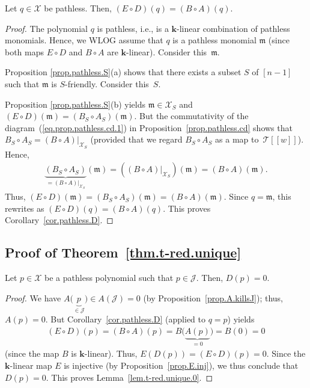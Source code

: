 \begin{Corollary}\label{cor.pathless.D}Let $q\in\mathcal{X}$ be pathless. Then, $( E\circ D ) (q) = ( B\circ A ) (q) $.
\end{Corollary}

\begin{proof}The polynomial $q$ is pathless, i.e., is a $\mathbf{k}$-linear combination of pathless monomials. Hence, we WLOG assume that $q$ is a pathless monomial $\mathfrak{m}$ (since both maps $E\circ D$ and $B\circ A$ are $\mathbf{k}$-linear). Consider this~$\mathfrak{m}$.

Proposition \ref{prop.pathless.S}(a) shows that there exists a subset $S$ of $[n-1] $ such that $\mathfrak{m}$ is $S$-friendly. Consider this~$S$.

Proposition \ref{prop.pathless.S}(b) yields $\mathfrak{m}\in\mathcal{X}_{S}$ and $(E\circ D) (\mathfrak{m}) = ( B_{S}\circ A_{S} ) (\mathfrak{m}) $. But the commutativity of the diagram~(\ref{eq.prop.pathless.cd.1}) in Proposition~\ref{prop.pathless.cd} shows that $B_{S}\circ A_{S}= ( B\circ A ) |_{\mathcal{X}_{S}}$ (provided that we regard $B_{S}\circ A_{S}$ as a map to~$\mathcal{T}[[w]] $). Hence,
\begin{gather*}
\underbrace{( B_{S}\circ A_{S}) }_{=( B\circ A)|_{\mathcal{X}_{S}}}(\mathfrak{m}) = (( B\circ A ) |_{\mathcal{X}_{S}} ) (\mathfrak{m}) = (B\circ A ) (\mathfrak{m}) .
\end{gather*}
Thus, $(E\circ D) (\mathfrak{m}) = ( B_{S}\circ A_{S}) (\mathfrak{m}) =( B\circ A ) (\mathfrak{m}) $. Since $q=\mathfrak{m}$, this rewrites as $(E\circ D) (q) = ( B\circ A ) (q) $. This proves Corollary~\ref{cor.pathless.D}.
\end{proof}

\subsection{Proof of Theorem~\ref{thm.t-red.unique}}

\begin{Lemma}\label{lem.t-red.unique.0}Let $p\in\mathcal{X}$ be a pathless polynomial such that $p\in\mathcal{J}$. Then, $D(p) =0$.
\end{Lemma}

\begin{proof}We have $A \big( \underbrace{p}_{\in\mathcal{J}} \big) \in A ( \mathcal{J} ) =0$ (by Proposition~\ref{prop.A.killsJ}); thus, $A(p) =0$. But Corollary~\ref{cor.pathless.D} (applied to $q=p$) yields
\begin{gather*}
(E\circ D) (p) =(B\circ A) (p) =B \Big( \underbrace{A(p) }_{=0} \Big) =B ( 0 ) =0
\end{gather*}
(since the map $B$ is $\mathbf{k}$-linear). Thus, $E ( D(p)) =(E\circ D) (p) =0$. Since the $\mathbf{k}$-linear map $E$ is injective (by Proposition~\ref{prop.E.inj}), we thus conclude that $D(p) =0$. This proves Lemma~\ref{lem.t-red.unique.0}.
\end{proof}

